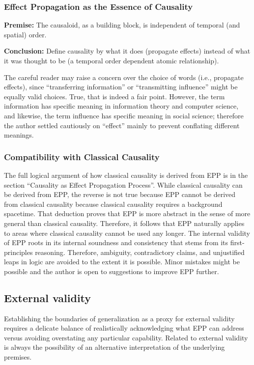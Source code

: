 \documentclass{article}
\begin{document}
\subsubsection{Effect Propagation as the Essence of Causality}

\textbf{Premise:} The causaloid, as a building block, is independent of temporal (and spatial) order.

\textbf{Conclusion:} Define causality by what it does (propagate effects) instead of what it was thought to be (a temporal order dependent atomic relationship).

The careful reader may raise a concern over the choice of words (i.e., propagate effects), since “transferring information” or “transmitting influence” might be equally valid choices. True, that is indeed a fair point. However, the term information has specific meaning in information theory and computer science, and likewise, the term influence has specific meaning in social science; therefore the author settled cautiously on “effect” mainly to prevent conflating different meanings.

\subsubsection{Compatibility with Classical Causality}

The full logical argument of how classical causality is derived from EPP is in the section “Causality as Effect Propagation Process”.
While classical causality can be derived from EPP, the reverse is not true because EPP cannot be derived from classical causality because classical causality requires a background spacetime. That deduction proves that EPP is more abstract in the sense of more general than classical causality. Therefore, it follows that EPP naturally applies to areas where classical causality cannot be used any longer. The internal validity of EPP roots in its internal soundness and consistency that stems from its first-principles reasoning. Therefore, ambiguity, contradictory claims, and unjustified leaps in logic are avoided to the extent it is possible. Minor mistakes might be possible and the author is open to suggestions  to improve EPP further.


\subsection{External validity}
\label{sec:validity_external}

Establishing the boundaries of generalization as a proxy for external validity requires a delicate balance of realistically acknowledging what EPP can address versus avoiding overstating  any particular capability. Related to external validity is always the possibility of an alternative interpretation of the underlying premises.
\end{document}
